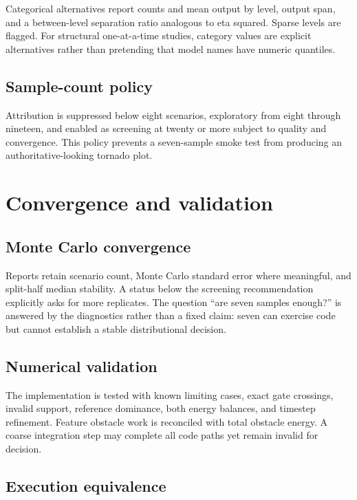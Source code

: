 \documentclass[11pt,oneside]{report}
\begin{document}
Categorical alternatives report counts and mean output by level, output span, and a
between-level separation ratio analogous to eta squared.  Sparse levels are flagged.
For structural one-at-a-time studies, category values are explicit alternatives rather
than pretending that model names have numeric quantiles.

\section{Sample-count policy}

Attribution is suppressed below eight scenarios, exploratory from eight through
nineteen, and enabled as screening at twenty or more subject to quality and convergence.
This policy prevents a seven-sample smoke test from producing an authoritative-looking
tornado plot.

\chapter{Convergence and validation}\label{ch:validation}

\section{Monte Carlo convergence}

Reports retain scenario count, Monte Carlo standard error where meaningful, and
split-half median stability.  A status below the screening recommendation explicitly
asks for more replicates.  The question ``are seven samples enough?'' is answered by the
diagnostics rather than a fixed claim: seven can exercise code but cannot establish a
stable distributional decision.

\section{Numerical validation}

The implementation is tested with known limiting cases, exact gate crossings, invalid
support, reference dominance, both energy balances, and timestep refinement.  Feature
obstacle work is reconciled with total obstacle energy.  A coarse integration step may
complete all code paths yet remain invalid for decision.

\section{Execution equivalence}
\end{document}
